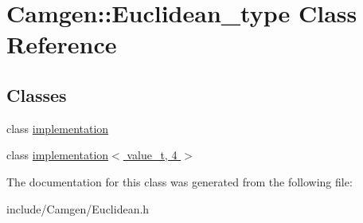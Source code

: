 \hypertarget{a00139}{}\section{Camgen\+:\+:Euclidean\+\_\+type Class Reference}
\label{a00139}
\subsection*{Classes}
\begin{DoxyCompactItemize}
\item 
class \hyperlink{a00299}{implementation}
\item 
class \hyperlink{a00301}{implementation$<$ value\+\_\+t, 4 $>$}
\end{DoxyCompactItemize}


The documentation for this class was generated from the following file\+:\begin{DoxyCompactItemize}
\item 
include/\+Camgen/Euclidean.\+h\end{DoxyCompactItemize}
